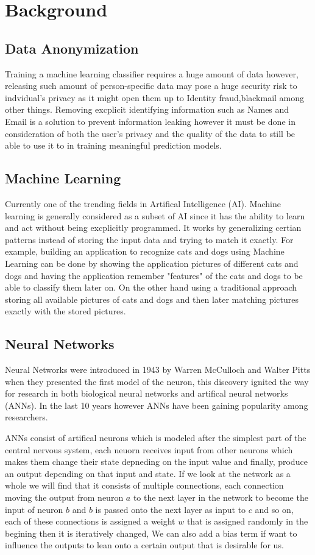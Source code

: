 \chapter{Background}
\label{chap:Two1}
\section{Data Anonymization}
Training a machine learning classifier requires a huge amount of data however, releasing such amount of person-specific data may pose a huge security risk to indvidual's privacy as it might open them up to Identity fraud,blackmail among other things.
Removing excplicit identifying information such as Names and Email is a solution to prevent information leaking however it must be done in consideration of both the user's privacy and the quality of the data to still be able to use it to in training meaningful prediction models.
\section{Machine Learning} 
Currently one of the trending fields in Artifical Intelligence (AI). Machine learning is generally considered as a subset of AI since it has the ability to learn and act without being
excplicitly programmed. It works by generalizing certian patterns instead of storing the input data and trying to match it exactly\cite{Intro}. For example, building an application to recognize
cats and dogs using Machine Learning can be done by showing the application pictures of different cats and dogs and having the application remember "features" of the cats and dogs to be
able to classify them later on. On the other hand using a traditional approach storing all available pictures of cats and dogs and then later matching pictures exactly with the stored pictures.
\section{Neural Networks}
Neural Networks were introduced in 1943 by Warren McCulloch and Walter Pitts when they presented the first model of the neuron, this discovery ignited the way for research in both biological neural networks and artifical neural networks (ANNs). In the last 10 years however ANNs have been gaining popularity among researchers.\par
ANNs consist of artifical neurons which is modeled after the simplest part of the central nervous system, each neuorn receives input from other neurons which makes them change their state depneding on the input value and finally, produce an output depending on that input and state.\cite{zell1994simulation}
If we look at the network as a whole we will find that it consists of multiple connections, each connection moving the output from neuron $a$ to the next layer in the network to become the input of
neuron $b$ and $b$ is passed onto the next layer as input to $c$ and so on, each of these connections is assigned a weight $w$ that is assigned randomly in the begining then it is iteratively changed, We can also add a bias term if want to influence the outputs to lean onto a certain output that is desirable for us.
